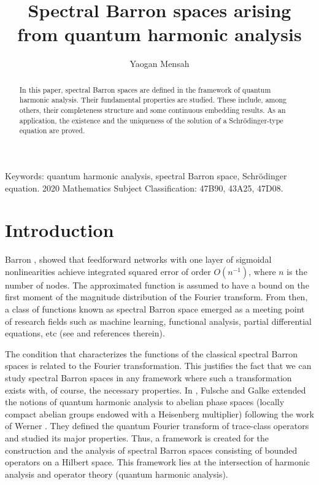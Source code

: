 \documentclass[11pt,a4paper]{amsart}
\date{}
\title[Spectral Barron spaces arising from quantum harmonic analysis]{Spectral Barron spaces arising from quantum harmonic analysis}
\author{Yaogan Mensah}
\begin{document}
\begin{abstract}
In this paper, spectral Barron spaces are defined in the framework of quantum harmonic analysis. Their fundamental properties are studied. These include, among others, their   completeness structure and some continuous embedding results. As an application, the existence and the uniqueness of the solution of a Schr\"odinger-type equation are proved.  
\end{abstract}
\maketitle




{\small Keywords: quantum harmonic analysis, spectral Barron space,  Schr\"odinger equation.}
\newline
{\small 2020 Mathematics Subject Classification: 47B90, 43A25, 47D08.}


\section{Introduction}
 Barron \cite{Barron},  showed that feedforward networks with one layer of sigmoidal nonlinearities achieve integrated squared error of order $O(n^{-1})$, where $n$ is the number of nodes. The approximated function is assumed to have a bound on the first moment of the magnitude distribution of the Fourier transform. From then, a class of functions known as spectral Barron space emerged 
 as a meeting point of research fields such as machine learning,  functional analysis, partial differential equations, etc (see \cite{Chen, Choulli,Meng} and references therein).
 
 The condition that characterizes the functions of the classical spectral Barron spaces is related to the Fourier transformation. This justifies the fact that we can study spectral Barron spaces in any framework where such a transformation exists with, of course, the necessary properties. In \cite{Fulsche}, Fulsche and Galke extended the notions of quantum harmonic analysis to abelian phase spaces (locally compact abelian groups endowed with a Heisenberg multiplier) following  the work of Werner \cite{Werner}.  They defined the  quantum Fourier transform of trace-class operators and studied  its major  properties. Thus, a framework  is created for the construction and the  analysis of spectral Barron spaces consisting of bounded operators on a Hilbert space. This framework lies at the intersection of harmonic analysis and operator theory  (quantum harmonic analysis). 
 
\end{document}
